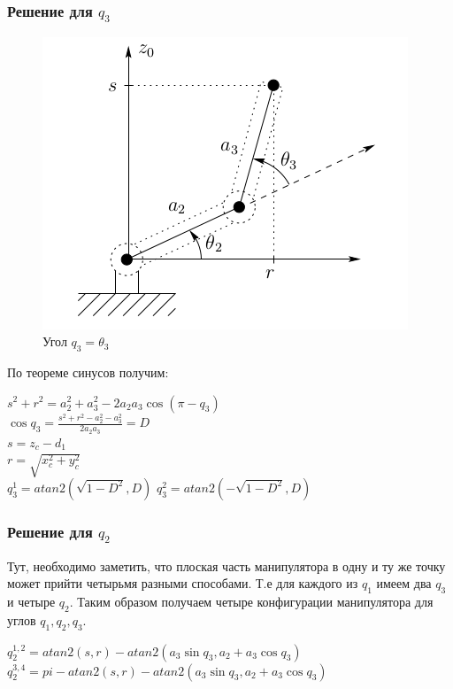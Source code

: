 \documentclass[a4paper,14pt]{extreport}
\begin{document}
	\subsubsection{Решение для $q_3$}
	\begin{figure}[H]
		\center\includegraphics[width=0.3\linewidth]{position_q3.png}
		\caption{Угол $q_3 = \theta_3$}
		\label{fig:scr3}
	\end{figure}
	По теореме синусов получим:
	\begin{center}
		$s^2 + r^2 = a_2^2 + a_3^2 - 2a_2a_3 \cos{(\pi - q_3)}$\\
		$\cos q_3 = \frac{s^2 + r^2 - a^2_2 - a^2_3}{2a_2a_3} = D$\\
		$s = z_c - d_1$\\
		$r = \sqrt{x_c^2 + y_c^2}$\\
		$q_3^1 = atan2( \sqrt{1 - D^2}, D)$
		$q_3^2 = atan2(-\sqrt{1 - D^2}, D)$
	\end{center}
	
	
	\subsubsection{Решение для $q_2$}
	
	Тут, необходимо заметить, что плоская часть манипулятора в одну и ту же точку может прийти четырьмя разными способами. Т.е для каждого из $q_1$ имеем два $q_3$ и четыре $q_2$. Таким образом получаем четыре конфигурации манипулятора для углов $q_1, q_2, q_3$.
	
	\begin{center}
		$q_2^{1,2} = atan2(s, r) - atan2(a_3 \sin q_3, a_2 + a_3 \cos q_3)$
		$q_2^{3,4} = pi - atan2(s, r) - atan2(a_3 \sin q_3, a_2 + a_3 \cos q_3)$
	\end{center}
	
	 
	
	
\end{document}
